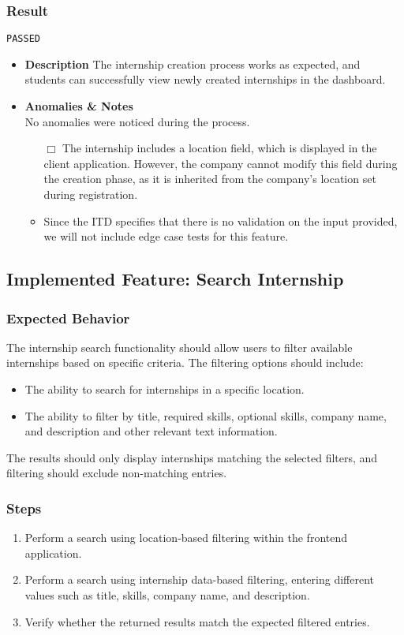\subsubsection{Result}
\verb|PASSED|
\begin{itemize}
    \item \textbf{\color{titleColor} Description}
    The internship creation process works as expected, and students can successfully view newly created internships in the dashboard.
    \item \textbf{\color{titleColor} Anomalies \& Notes}\\
      No anomalies were noticed during the process.
    \begin{itemize}
            \item [{\color{titleColor}\(\Box \)}] The internship includes a location field, which is displayed in the client application. However, the company cannot modify this field during the creation phase, as it is inherited from the company’s location set during registration.
            \item Since the ITD specifies that there is no validation on the input provided, we will not include edge case tests for this feature.
        \end{itemize} 
\end{itemize}

\subsection{Implemented Feature:  Search Internship}
\subsubsection{Expected Behavior}
The internship search functionality should allow users to filter available internships based on specific criteria. The filtering options should include:
\begin{itemize}
    \item The ability to search for internships in a specific location.
    \item The ability to filter by title, required skills, optional skills, company name, and description and other relevant text information.
\end{itemize}
The results should only display internships matching the selected filters, and filtering should exclude non-matching entries.
\subsubsection{Steps}
\begin{enumerate}
    \item Perform a search using location-based filtering within the frontend application.
    \item Perform a search using internship data-based filtering, entering different values such as title, skills, company name, and description.
    \item Verify whether the returned results match the expected filtered entries.
\end{enumerate}

